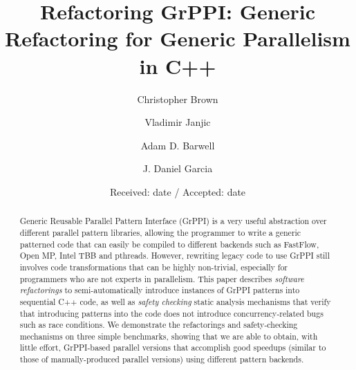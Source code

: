 \title{Refactoring GrPPI: Generic Refactoring for Generic Parallelism in C++}%



\author{Christopher Brown         \and
        Vladimir Janjic \and 
        Adam D. Barwell \and
        J. Daniel Garcia
}



\date{Received: date / Accepted: date}

\maketitle

\begin{abstract}
Generic Reusable Parallel Pattern Interface (GrPPI) is a very useful abstraction over different parallel pattern libraries, allowing the programmer to write a generic patterned code that can easily be compiled to different backends such as FastFlow, Open MP, Intel TBB and pthreads. However, rewriting legacy code to use GrPPI still involves code transformations that can be highly non-trivial, especially for programmers who are not experts in parallelism. This paper describes \emph{software refactorings} to semi-automatically introduce instances of GrPPI patterns into sequential C++ code, as well as \emph{safety checking} static analysis mechanisms that verify that introducing patterns into the code does not introduce concurrency-related bugs such as race conditions. We demonstrate the refactorings and safety-checking mechanisms on three simple benchmarks, showing that we are able to obtain, with little effort, GrPPI-based parallel versions that accomplish good speedups (similar to those of manually-produced parallel versions) using different pattern backends.
\end{abstract}

